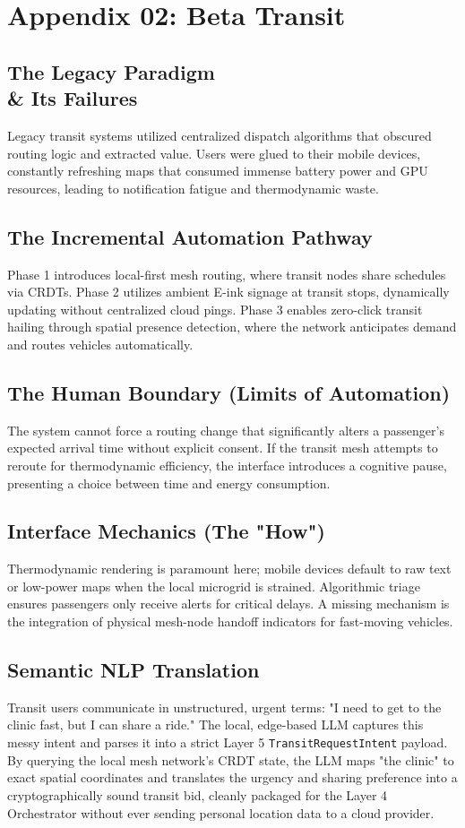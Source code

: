 \chapter{Appendix 02: Beta Transit}

\section{The Legacy Paradigm \\\& Its Failures}
Legacy transit systems utilized centralized dispatch algorithms that obscured routing logic and extracted value. Users were glued to their mobile devices, constantly refreshing maps that consumed immense battery power and GPU resources, leading to notification fatigue and thermodynamic waste.

\section{The Incremental Automation Pathway}
Phase 1 introduces local-first mesh routing, where transit nodes share schedules via CRDTs. Phase 2 utilizes ambient E-ink signage at transit stops, dynamically updating without centralized cloud pings. Phase 3 enables zero-click transit hailing through spatial presence detection, where the network anticipates demand and routes vehicles automatically.

\section{The Human Boundary (Limits of Automation)}
The system cannot force a routing change that significantly alters a passenger's expected arrival time without explicit consent. If the transit mesh attempts to reroute for thermodynamic efficiency, the interface introduces a cognitive pause, presenting a choice between time and energy consumption.

\section{Interface Mechanics (The "How")}
Thermodynamic rendering is paramount here; mobile devices default to raw text or low-power maps when the local microgrid is strained. Algorithmic triage ensures passengers only receive alerts for critical delays. A missing mechanism is the integration of physical mesh-node handoff indicators for fast-moving vehicles.

\section{Semantic NLP Translation}
Transit users communicate in unstructured, urgent terms: "I need to get to the clinic fast, but I can share a ride." The local, edge-based LLM captures this messy intent and parses it into a strict Layer 5 \texttt{TransitRequestIntent} payload. By querying the local mesh network's CRDT state, the LLM maps "the clinic" to exact spatial coordinates and translates the urgency and sharing preference into a cryptographically sound transit bid, cleanly packaged for the Layer 4 Orchestrator without ever sending personal location data to a cloud provider.
